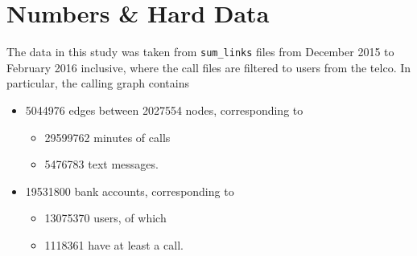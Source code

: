 \section{Numbers \& Hard Data}

The data in this study was taken from \texttt{sum\_links} files from December 2015 to February 2016 inclusive, where the call files are filtered to users from the telco. In particular, the calling graph contains

\begin{itemize}
	\item \num{5044976} edges between \num{2027554} nodes, corresponding to
	\begin{itemize}
		\item \num{29599762} minutes of calls
		\item \num{5476783} text messages.
	\end{itemize}
	\item \num{19531800} bank accounts, corresponding to
	\begin{itemize}
		\item \num{13075370} users, of which
		\item \num{1118361} have at least a call.
	\end{itemize}
\end{itemize}
